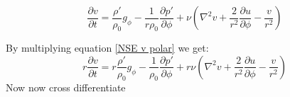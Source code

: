 \documentclass{article}
\begin{document}
\begin{equation}
	\frac{\partial v}{\partial t} = \frac{\rho'}{\rho_0} g_{\phi} - \frac{1}{r \rho_0} \frac{\partial p'}{\partial \phi} + \nu (\nabla^2 v + \frac{2}{r^2} \frac{\partial u}{\partial \phi} - \frac{v}{r^2})
	\label{NSE v polar}
\end{equation}

By multiplying equation \ref{NSE v polar} we get:
\begin{equation}
	r \frac{\partial v}{\partial t} = r \frac{\rho'}{\rho_0} g_{\phi} - \frac{1}{\rho_0} \frac{\partial p'}{\partial \phi} + r \nu (\nabla^2 v + \frac{2}{r^2} \frac{\partial u}{\partial \phi} - \frac{v}{r^2})
	\label{NSE v polar times r}
\end{equation}
Now now cross differentiate 

 






 
\end{document}
